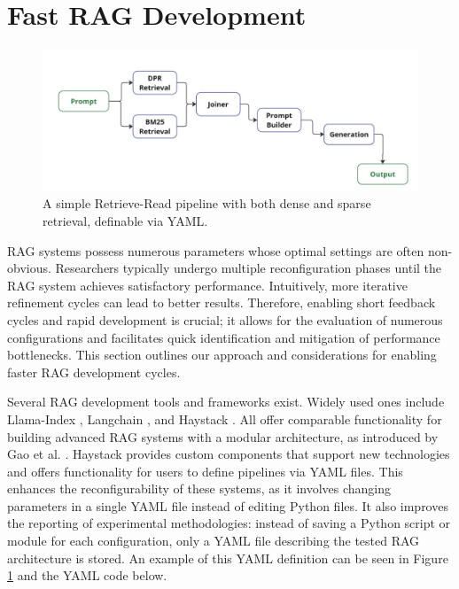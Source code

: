 \section{Fast RAG Development}\label{sec:fastrag}

\begin{figure}[!ht]
    \centering
    \includegraphics[width=\textwidth]{images/showcase-pipeline.pdf}
    \caption{A simple Retrieve-Read pipeline with both dense and sparse retrieval, definable via YAML.}
    \label{fig:showcase}
\end{figure}

RAG systems possess numerous parameters whose optimal settings are often non-obvious. Researchers typically undergo multiple reconfiguration phases until the RAG system achieves satisfactory performance. Intuitively, more iterative refinement cycles can lead to better results. Therefore, enabling short feedback cycles and rapid development is crucial; it allows for the evaluation of numerous configurations and facilitates quick identification and mitigation of performance bottlenecks. This section outlines our approach and considerations for enabling faster RAG development cycles.

Several RAG development tools and frameworks exist. Widely used ones include Llama-Index \cite{Liu_LlamaIndex_2022}, Langchain \cite{Chase_LangChain_2022}, and Haystack \cite{Pietsch_Haystack_the_end-to-end_2019}. All offer comparable functionality for building advanced RAG systems with a modular architecture, as introduced by Gao et al. \cite{Gao.18.12.2023}. Haystack provides custom components that support new technologies and offers functionality for users to define pipelines via YAML files. This enhances the reconfigurability of these systems, as it involves changing parameters in a single YAML file instead of editing Python files. It also improves the reporting of experimental methodologies: instead of saving a Python script or module for each configuration, only a YAML file describing the tested RAG architecture is stored. An example of this YAML definition can be seen in Figure \ref{fig:showcase} and the YAML code below.

